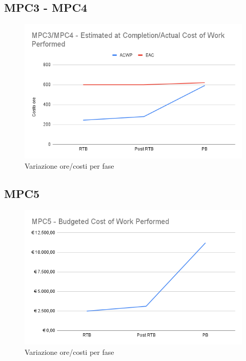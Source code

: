 \subsection{MPC3 - MPC4}
\begin{figure}[H]
    \centering
    \includegraphics[scale=0.65]{../../assets/MPC3_MPC4 - Estimated at Completion_Actual Cost of Work Performed.png}
    \caption{Variazione ore/costi per fase}
\end{figure}
\subsection{MPC5}
\begin{figure}[H]
    \centering
    \includegraphics[scale=0.65]{../../assets/MPC5 - Budgeted Cost of Work Performed.png}
    \caption{Variazione ore/costi per fase}
\end{figure}
